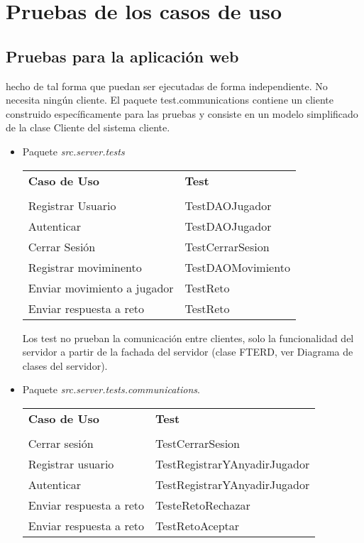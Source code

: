\section{Pruebas de los casos de uso}

\subsection{Pruebas para la aplicación web}

 hecho de tal forma que puedan ser ejecutadas de forma independiente. No necesita ningún cliente. El paquete test.communications contiene un cliente construido específicamente para las pruebas y consiste en un modelo simplificado de la clase Cliente del sistema cliente.

\begin{itemize}
\item Paquete \emph{src.server.tests}

\begin{center}
{\footnotesize
\begin{tabularx}{0.95\textwidth}{p{}|X}

\textbf{Caso de Uso} & \textbf{Test} \\
& \\
Registrar Usuario & TestDAOJugador\\
Autenticar & TestDAOJugador\\
Cerrar Sesión & TestCerrarSesion\\
Registrar moviminento & TestDAOMovimiento\\
Enviar movimiento a jugador & TestReto\\
Enviar respuesta a reto & TestReto\\
\end{tabularx}
}
\end{center}

Los test no prueban la comunicación entre clientes, solo la funcionalidad del servidor a partir de la fachada del servidor (clase FTERD, ver Diagrama de clases del servidor).

\item Paquete \emph{src.server.tests.communications}.
\begin{center}
{\footnotesize
\begin{tabularx}{0.95\textwidth}{p{}|X}
\textbf{Caso de Uso} & \textbf{Test} \\
& \\
Cerrar sesión & TestCerrarSesion\\
Registrar usuario & TestRegistrarYAnyadirJugador\\
Autenticar & TestRegistrarYAnyadirJugador\\
Enviar respuesta a reto & TesteRetoRechazar\\
Enviar respuesta a reto & TestRetoAceptar\\
\end{tabularx}
}
\end{center}
\end{itemize}

